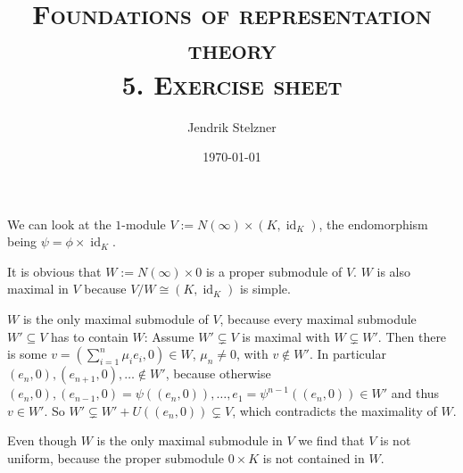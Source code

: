 \documentclass[a4paper,10pt]{article}
\title{\textsc{Foundations of representation theory \\ \Large 5. Exercise sheet}}
\author{Jendrik Stelzner}
\date{\today}
\theoremstyle{definition}
\newcommand{\id}{\operatorname{id}}
\begin{document}
\maketitle





\section{}





\section{}





\section{}
We can look at the $1$-module $V := N(\infty) \times (K, \id_K)$, the endomorphism being $\psi = \phi \times \id_K$.

It is obvious that $W := N(\infty) \times 0$ is a proper submodule of $V$. $W$ is also maximal in $V$ because $V / W \cong (K, \id_K)$ is simple.

$W$ is the only maximal submodule of $V$, because every maximal submodule $W' \subseteq V$ has to contain $W$: Assume $W' \subsetneq V$ is maximal with $W \subsetneq W'$. Then there is some $v = (\sum_{i=1}^n \mu_i e_i, 0) \in W$, $\mu_n \neq 0$, with $v \not\in W'$. In particular $(e_n,0), (e_{n+1},0),\ldots \not \in W'$, because otherwise $(e_n,0), (e_{n-1},0) = \psi((e_n,0)), \ldots, e_1 = \psi^{n-1}((e_n,0)) \in W'$ and thus $v \in W'$. So $W' \subsetneq W'+U((e_n,0)) \subsetneq V$, which contradicts the maximality of $W$.

Even though $W$ is the only maximal submodule in $V$ we find that $V$ is not uniform, because the proper submodule $0 \times K$ is not contained in $W$.





\section{}
\end{document}
